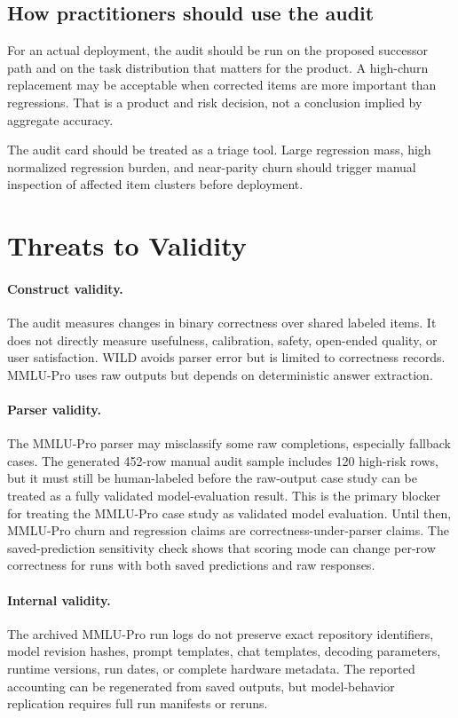 \documentclass[manuscript, screen, review, nonacm]{jair}
\begin{document}
\subsection{How practitioners should use the audit}

For an actual deployment, the audit should be run on the proposed successor path and on the task distribution that matters for the product. A high-churn replacement may be acceptable when corrected items are more important than regressions. That is a product and risk decision, not a conclusion implied by aggregate accuracy.

The audit card should be treated as a triage tool. Large regression mass, high normalized regression burden, and near-parity churn should trigger manual inspection of affected item clusters before deployment.

\section{Threats to Validity}

\paragraph{Construct validity.}
The audit measures changes in binary correctness over shared labeled items. It does not directly measure usefulness, calibration, safety, open-ended quality, or user satisfaction. WILD avoids parser error but is limited to correctness records. MMLU-Pro uses raw outputs but depends on deterministic answer extraction.

\paragraph{Parser validity.}
The MMLU-Pro parser may misclassify some raw completions, especially fallback cases. The generated 452-row manual audit sample includes 120 high-risk rows, but it must still be human-labeled before the raw-output case study can be treated as a fully validated model-evaluation result. This is the primary blocker for treating the MMLU-Pro case study as validated model evaluation. Until then, MMLU-Pro churn and regression claims are correctness-under-parser claims. The saved-prediction sensitivity check shows that scoring mode can change per-row correctness for runs with both saved predictions and raw responses.

\paragraph{Internal validity.}
The archived MMLU-Pro run logs do not preserve exact repository identifiers, model revision hashes, prompt templates, chat templates, decoding parameters, runtime versions, run dates, or complete hardware metadata. The reported accounting can be regenerated from saved outputs, but model-behavior replication requires full run manifests or reruns.
\end{document}

